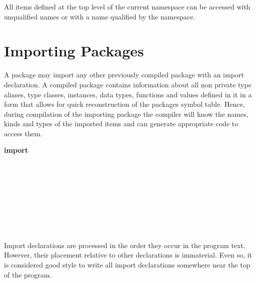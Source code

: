 All items defined at the top level of the current namespace can be
accessed with unqualified names or with a name qualified by the
namespace.


\section{Importing Packages} \label{import} 


A package may import any other previously compiled package with an import declaration.
A compiled package contains information about all non private type aliases, type classes, instances, 
data types, functions and values defined in it in a form that allows for quick reconstruction of the packages symbol table.
Hence, during compilation of the importing package the compiler will know the names, kinds and types of the imported items and can generate appropriate code to access them.

\begin{flushleft}
 \textbf{import}     {}\\
  \sym{(}  \sym{)} \\
   \\
  \oder{}    \oder{}  \oder{} 
  \oder{}   \oder{}  \\
  \oder {}   \oder {}  \\
 \sym{(}  \sym{)}\\
   \\
   \oder {}  \oder {}  \\
  \\
\end{flushleft}


Import declarations are processed in the order they occur in the program text. 
However, their placement relative to other declarations is immaterial. 
Even so, it is considered good style to write all import declarations somewhere near the top of the program.

